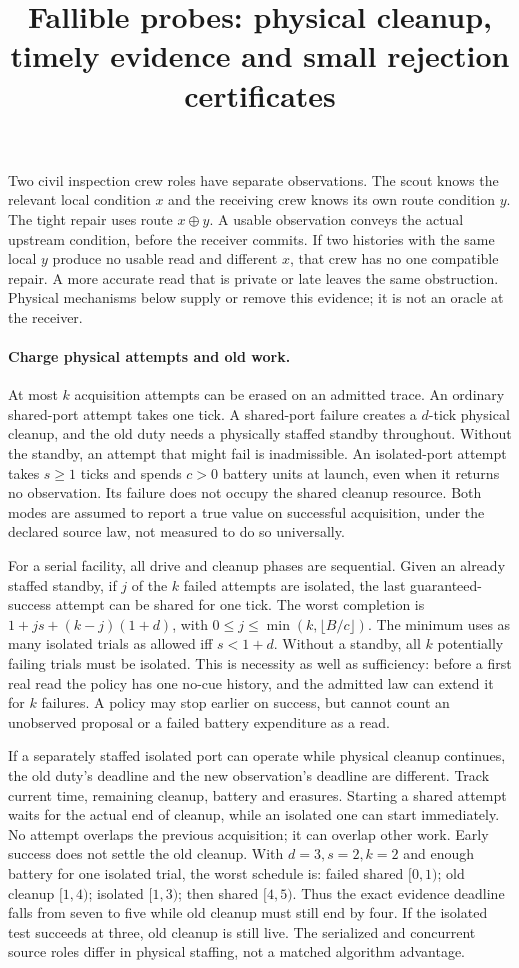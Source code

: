 \documentclass[11pt]{article}
\title{Fallible probes: physical cleanup, timely evidence and small rejection certificates}
\author{}\date{}
\begin{document}
\maketitle
Two civil inspection crew roles have separate observations. The
scout knows the relevant local condition $x$ and the receiving
crew knows its own route condition $y$. The tight repair uses
route $x\oplus y$. A usable observation conveys the actual
upstream condition, before the receiver commits. If two
histories with the same local $y$ produce no usable read and
different $x$, that crew has no one compatible repair.
A more accurate read that is private or late leaves the same
obstruction. Physical mechanisms below supply or remove this
evidence; it is not an oracle at the receiver.

\paragraph{Charge physical attempts and old work.}
At most $k$ acquisition attempts can be erased on an admitted trace.
An ordinary shared-port attempt takes one tick. A shared-port
failure creates a $d$-tick physical cleanup, and the old duty
needs a physically staffed standby throughout. Without the standby,
an attempt that might fail is inadmissible. An isolated-port attempt
takes $s\ge1$ ticks and spends $c>0$ battery units at launch, even
when it returns no observation. Its failure does not occupy the
shared cleanup resource. Both modes are assumed to report a
true value on successful acquisition, under the declared source
law, not measured to do so universally.

For a serial facility, all drive and cleanup phases are sequential.
Given an already staffed standby, if $j$ of the $k$ failed attempts
are isolated, the last guaranteed-success attempt can be shared for
one tick. The worst completion is
$1+j s+(k-j)(1+d)$, with $0\le j\le\min(k,\lfloor B/c\rfloor)$.
The minimum uses as many isolated trials as allowed iff $s<1+d$.
Without a standby, all $k$ potentially failing trials must be isolated.
This is necessity as well as sufficiency: before a first real read
the policy has one no-cue history, and the admitted law can extend it
for $k$ failures. A policy may stop earlier on success, but cannot
count an unobserved proposal or a failed battery expenditure as a read.

If a separately staffed isolated port can operate while physical
cleanup continues, the old duty's deadline and the new observation's
deadline are different. Track current time, remaining cleanup,
battery and erasures. Starting a shared attempt waits for the actual
end of cleanup, while an isolated one can start immediately. No
attempt overlaps the previous acquisition; it can overlap other work.
Early success does not settle the old cleanup. With $d=3,s=2,k=2$
and enough battery for one isolated trial, the worst schedule is:
failed shared $[0,1)$; old cleanup $[1,4)$; isolated $[1,3)$;
then shared $[4,5)$. Thus the exact evidence deadline falls
from seven to five while old cleanup must still end by four.
If the isolated test succeeds at three, old cleanup is still live.
The serialized and concurrent source roles differ in physical staffing,
not a matched algorithm advantage.
\end{document}
